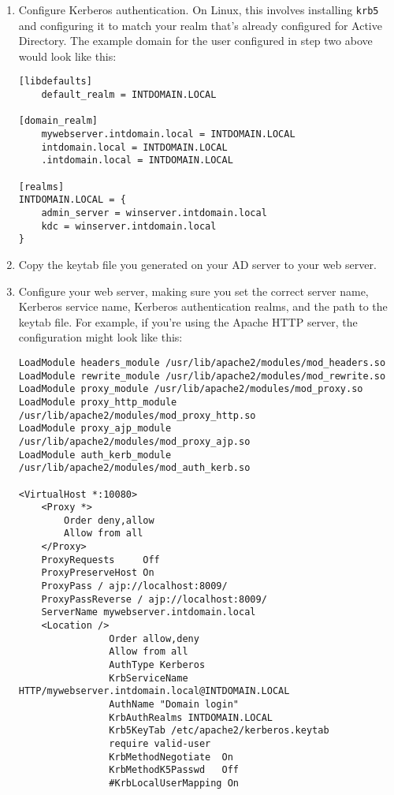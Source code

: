 \begin{enumerate}
\def\labelenumi{\arabic{enumi}.}
\item
  Configure Kerberos authentication. On Linux, this involves installing
  \texttt{krb5} and configuring it to match your realm that's already
  configured for Active Directory. The example domain for the user
  configured in step two above would look like this:

\begin{verbatim}
[libdefaults]
    default_realm = INTDOMAIN.LOCAL

[domain_realm]
    mywebserver.intdomain.local = INTDOMAIN.LOCAL
    intdomain.local = INTDOMAIN.LOCAL
    .intdomain.local = INTDOMAIN.LOCAL

[realms]
INTDOMAIN.LOCAL = {
    admin_server = winserver.intdomain.local
    kdc = winserver.intdomain.local
}
\end{verbatim}
\item
  Copy the keytab file you generated on your AD server to your web
  server.
\item
  Configure your web server, making sure you set the correct server
  name, Kerberos service name, Kerberos authentication realms, and the
  path to the keytab file. For example, if you're using the Apache HTTP
  server, the configuration might look like this:

\begin{verbatim}
LoadModule headers_module /usr/lib/apache2/modules/mod_headers.so
LoadModule rewrite_module /usr/lib/apache2/modules/mod_rewrite.so
LoadModule proxy_module /usr/lib/apache2/modules/mod_proxy.so
LoadModule proxy_http_module /usr/lib/apache2/modules/mod_proxy_http.so
LoadModule proxy_ajp_module /usr/lib/apache2/modules/mod_proxy_ajp.so
LoadModule auth_kerb_module /usr/lib/apache2/modules/mod_auth_kerb.so

<VirtualHost *:10080>
    <Proxy *>
        Order deny,allow
        Allow from all
    </Proxy>
    ProxyRequests     Off
    ProxyPreserveHost On
    ProxyPass / ajp://localhost:8009/
    ProxyPassReverse / ajp://localhost:8009/
    ServerName mywebserver.intdomain.local
    <Location />
                Order allow,deny
                Allow from all
                AuthType Kerberos
                KrbServiceName HTTP/mywebserver.intdomain.local@INTDOMAIN.LOCAL
                AuthName "Domain login"
                KrbAuthRealms INTDOMAIN.LOCAL
                Krb5KeyTab /etc/apache2/kerberos.keytab
                require valid-user
                KrbMethodNegotiate  On
                KrbMethodK5Passwd   Off
                #KrbLocalUserMapping On


\end{verbatim}
\end{enumerate}
